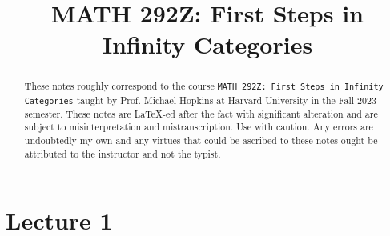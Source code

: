 \documentclass[]{scrarticle}
\title{MATH 292Z: First Steps in Infinity Categories}
\author{\spacedlowsmallcaps{Wern Juin Gabriel Ong}}
\date{}
\theoremstyle{definition}
\theoremstyle{remark}
\theoremstyle{example}
\begin{document}
\maketitle
\begin{abstract}
    These notes roughly correspond to the course \texttt{MATH 292Z: First Steps in Infinity Categories} taught by Prof. Michael Hopkins at Harvard University in the Fall 2023 semester. These notes are \LaTeX-ed after the fact with significant alteration and are subject to misinterpretation and mistranscription. Use with caution. Any errors are undoubtedly my own and any virtues that could be ascribed to these notes ought be attributed to the instructor and not the typist. 
\end{abstract}
\tableofcontents
\section{Lecture 1}
\end{document}
